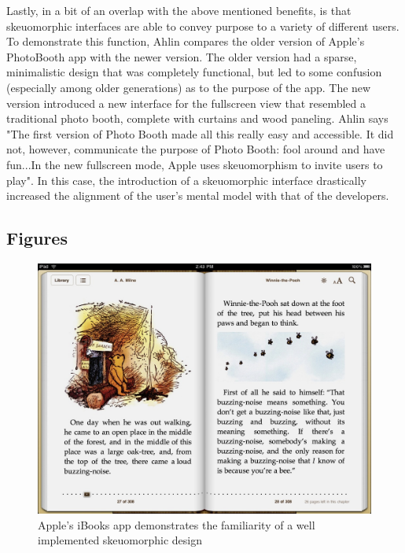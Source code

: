 \documentclass{article}
\begin{document}
	Lastly, in a bit of an overlap with the above mentioned benefits, is that skeuomorphic interfaces are able to convey purpose to a variety of different users. To demonstrate this function, Ahlin compares the older version of Apple's PhotoBooth app with the newer version. The older version had a sparse, minimalistic design that was completely functional, but led to some confusion (especially among older generations) as to the purpose of the app. The new version introduced a new interface for the fullscreen view that resembled a traditional photo booth, complete with curtains and wood paneling. Ahlin says "The first version of Photo Booth made all this really easy and accessible. It did not, however, communicate the purpose of Photo Booth: fool around and have fun...In the new fullscreen mode, Apple uses skeuomorphism to invite users to play"\cite{story}. In this case, the introduction of a skeuomorphic interface drastically increased the alignment of the user's mental model with that of the developers.

\subsection{Figures}

\begin{figure}
\centering
\includegraphics[width=5in]{iBooks.jpg} 

\caption{Apple's iBooks app demonstrates the familiarity of a well implemented skeuomorphic design}
\label{ibooks}
\end{figure}
\end{document}
